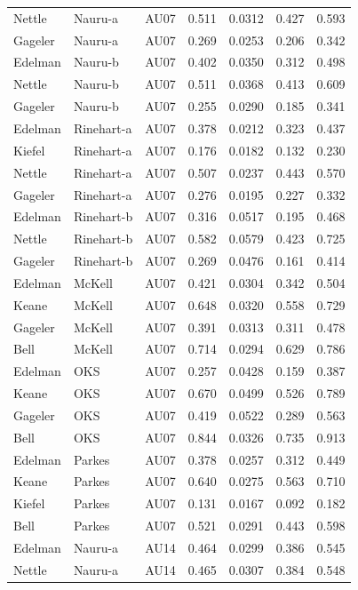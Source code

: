 \documentclass{monashthesis}
\begin{document}
\begin{center}
\begin{longtable}{lllllll}
Nettle & Nauru-a & AU07 & 0.511 & 0.0312 & 0.427 & 0.593 \\
Gageler & Nauru-a & AU07 & 0.269 & 0.0253 & 0.206 & 0.342 \\
Edelman & Nauru-b & AU07 & 0.402 & 0.0350 & 0.312 & 0.498 \\
Nettle & Nauru-b & AU07 & 0.511 & 0.0368 & 0.413 & 0.609 \\
Gageler & Nauru-b & AU07 & 0.255 & 0.0290 & 0.185 & 0.341 \\
Edelman & Rinehart-a & AU07 & 0.378 & 0.0212 & 0.323 & 0.437 \\
Kiefel & Rinehart-a & AU07 & 0.176 & 0.0182 & 0.132 & 0.230 \\
Nettle & Rinehart-a & AU07 & 0.507 & 0.0237 & 0.443 & 0.570 \\
Gageler & Rinehart-a & AU07 & 0.276 & 0.0195 & 0.227 & 0.332 \\
Edelman & Rinehart-b & AU07 & 0.316 & 0.0517 & 0.195 & 0.468 \\
Nettle & Rinehart-b & AU07 & 0.582 & 0.0579 & 0.423 & 0.725 \\
Gageler & Rinehart-b & AU07 & 0.269 & 0.0476 & 0.161 & 0.414 \\
Edelman & McKell & AU07 & 0.421 & 0.0304 & 0.342 & 0.504 \\
Keane & McKell & AU07 & 0.648 & 0.0320 & 0.558 & 0.729 \\
Gageler & McKell & AU07 & 0.391 & 0.0313 & 0.311 & 0.478 \\
Bell & McKell & AU07 & 0.714 & 0.0294 & 0.629 & 0.786 \\
Edelman & OKS & AU07 & 0.257 & 0.0428 & 0.159 & 0.387 \\
Keane & OKS & AU07 & 0.670 & 0.0499 & 0.526 & 0.789 \\
Gageler & OKS & AU07 & 0.419 & 0.0522 & 0.289 & 0.563 \\
Bell & OKS & AU07 & 0.844 & 0.0326 & 0.735 & 0.913 \\
Edelman & Parkes & AU07 & 0.378 & 0.0257 & 0.312 & 0.449 \\
Keane & Parkes & AU07 & 0.640 & 0.0275 & 0.563 & 0.710 \\
Kiefel & Parkes & AU07 & 0.131 & 0.0167 & 0.092 & 0.182 \\
Bell & Parkes & AU07 & 0.521 & 0.0291 & 0.443 & 0.598 \\
Edelman & Nauru-a & AU14 & 0.464 & 0.0299 & 0.386 & 0.545 \\
Nettle & Nauru-a & AU14 & 0.465 & 0.0307 & 0.384 & 0.548 \\

\end{longtable}
\end{center}
\end{document}
